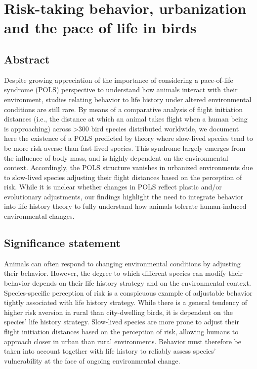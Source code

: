 \chapter[Risk-taking behavior, urbanization and POLS]{Risk-taking behavior,
urbanization and the pace of life in birds}\label{ch:POLS}


\section*{Abstract}

Despite growing appreciation of the importance of considering a pace-of-life syndrome (POLS) perspective to understand how
animals interact with their environment, studies relating behavior to life history under altered environmental conditions are still
rare. By means of a comparative analysis of flight initiation distances (i.e., the distance at which an animal takes flight when a
human being is approaching) across \textgreater{300} bird species distributed worldwide, we document here the existence of a POLS
predicted by theory where slow-lived species tend to be more risk-averse than fast-lived species. This syndrome largely emerges
from the influence of body mass, and is highly dependent on the environmental context. Accordingly, the POLS structure
vanishes in urbanized environments due to slow-lived species adjusting their flight distances based on the perception of risk.
While it is unclear whether changes in POLS reflect plastic and/or evolutionary adjustments, our findings highlight the need to
integrate behavior into life history theory to fully understand how animals tolerate human-induced environmental changes.


\section*{Significance statement}

Animals can often respond to changing environmental conditions by adjusting their behavior. However, the degree to which
different species can modify their behavior depends on their life history strategy and on the environmental context. 
Species-specific perception of risk is a conspicuous example of adjustable behavior tightly associated with life history strategy. While
there is a general tendency of higher risk aversion in rural than city-dwelling birds, it is dependent on the species’ life history
strategy. Slow-lived species are more prone to adjust their flight initiation distances based on the perception of risk, allowing
humans to approach closer in urban than rural environments. Behavior must therefore be taken into account together with life
history to reliably assess species’ vulnerability at the face of ongoing environmental change.


